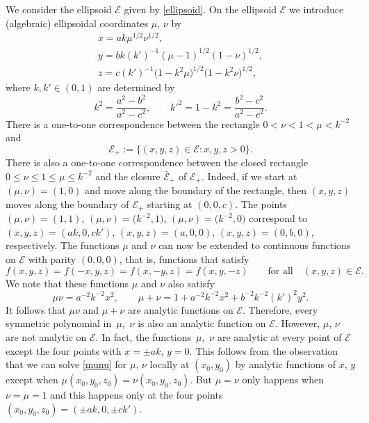 \documentclass[pdftex]{sigma}
\newcommand{\E}{\mathcal{E}}
\numberwithin{equation}{section}
\begin{document}
We consider the ellipsoid $\E$ given by \eqref{ellipsoid}.
On the ellipsoid $\E$ we introduce (algebraic) ellipsoidal coordinates $\mu$, $\nu$ \cite[Section~15.1.1]{EMO3} by
\begin{gather}
x=a k\mu^{1/2}\nu^{1/2},\label{ell1}\\
y= b k (k')^{-1}(\mu-1)^{1/2}(1-\nu)^{1/2},\label{ell2}\\
z=c (k')^{-1}\bigl(1-k^2\mu\bigr)^{1/2}\bigl(1-k^2\nu\bigr)^{1/2},\label{ell3}
\end{gather}
where $k,k'\in(0,1)$ are determined by
\begin{equation}\label{k}
 k^2=\frac{a^2-b^2}{a^2-c^2},\qquad k'^2=1-k^2= \frac{b^2-c^2}{a^2-c^2}.
 \end{equation}
There is a one-to-one correspondence between the rectangle $0<\nu<1<\mu<k^{-2}$ and
\[ \E_+:=\{(x,y,z)\in\E\colon x,y,z>0\} .\]
There is also a one-to-one correspondence between the closed rectangle ${0\le\nu\le 1\le \mu\le k^{-2}}$
and the closure $\bar{\E}_+$ of $\E_+$.
Indeed, if we start at $(\mu,\nu)=(1,0)$ and move along the boundary of the rectangle, then
$(x,y,z)$ moves along the boundary of $\E_+$ starting at $(0,0,c)$. The points $(\mu,\nu)=(1,1)$, $(\mu,\nu)=\bigl(k^{-2},1\bigr)$, $(\mu,\nu)=\bigl(k^{-2},0\bigr)$ correspond to
$(x,y,z)=(ak,0,ck')$, $(x,y,z)=(a,0,0)$, $(x,y,z)=(0,b,0)$, respectively.
The functions $\mu$ and $\nu$ can now be extended to continuous functions on $\E$ with parity $(0,0,0)$,
that is, functions that satisfy
\[ f(x,y,z)=f(-x,y,z)=f(x,-y,z)=f(x,y,-z)\qquad \text{for all} \quad (x,y,z)\in\E.\]
We note that these functions $\mu$ and $\nu$ also satisfy
\begin{equation}\label{munu}
\mu\nu=a^{-2}k^{-2} x^2,\qquad \mu+\nu=1+a^{-2}k^{-2} x^2+b^{-2}k^{-2}(k')^2y^2 .
\end{equation}
It follows that $\mu\nu$ and $\mu+\nu$ are analytic functions on $\E$. Therefore, every symmetric polynomial
in~$\mu$,~$\nu$ is also an analytic function on $\E$. However, $\mu$, $\nu$ are not analytic on $\E$.
In fact, the functions~$\mu$,~$\nu$ are analytic at every point of $\E$ except the four points
with $x=\pm ak$, $y=0$. This follows from the observation that we can solve \eqref{munu} for $\mu$, $\nu$
locally at $(x_0,y_0)$ by analytic functions of $x$, $y$ except when $\mu(x_0,y_0,z_0)=\nu(x_0,y_0,z_0)$.
But $\mu=\nu$ only happens when $\nu=\mu=1$ and this happens only at the four points $(x_0,y_0,z_0)=(\pm ak,0,\pm ck')$.
\end{document}
